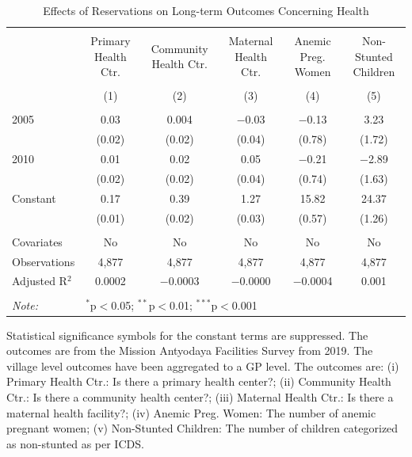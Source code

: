 \begin{table}
\centering
\begin{threeparttable}

  \caption{Effects of Reservations on Long-term Outcomes Concerning Health} 
  \label{raj_shrug_health_05_10} 
\scriptsize 
\begin{tabular}{@{\extracolsep{0pt}}lccccc} 
\\[-1.8ex]\hline 
\hline \\[-1.8ex] 
 & Primary Health Ctr. & Community Health Ctr. & Maternal Health Ctr. & Anemic Preg. Women & Non-Stunted Children \\ 
\\[-1.8ex] & (1) & (2) & (3) & (4) & (5)\\ 
\hline \\[-1.8ex] 
 2005 & 0.03 & 0.004 & $-$0.03 & $-$0.13 & 3.23 \\ 
  & (0.02) & (0.02) & (0.04) & (0.78) & (1.72) \\ 
  2010 & 0.01 & 0.02 & 0.05 & $-$0.21 & $-$2.89 \\ 
  & (0.02) & (0.02) & (0.04) & (0.74) & (1.63) \\ 
  Constant & 0.17 & 0.39 & 1.27 & 15.82 & 24.37 \\ 
  & (0.01) & (0.02) & (0.03) & (0.57) & (1.26) \\ 
 \hline \\[-1.8ex] 
Covariates & No & No & No & No & No \\ 
Observations & 4,877 & 4,877 & 4,877 & 4,877 & 4,877 \\ 
Adjusted R$^{2}$ & 0.0002 & $-$0.0003 & $-$0.0000 & $-$0.0004 & 0.001 \\ 
\hline 
\hline \\[-1.8ex] 
\textit{Note:}  & \multicolumn{5}{l}{$^{*}$p$<$0.05; $^{**}$p$<$0.01; $^{***}$p$<$0.001} \\ 
\end{tabular} 
\begin{tablenotes}[flushleft]
\setlength{\itemindent}{0em}
\scriptsize
\item[] Statistical significance symbols for the constant terms are suppressed. The outcomes are from the Mission Antyodaya Facilities Survey from 2019. The village level outcomes have been aggregated to a GP level. The outcomes are:
                    (i) Primary Health Ctr.: Is there a primary health center?;
                    (ii) Community Health Ctr.: Is there a community health center?;
                    (iii) Maternal Health Ctr.: Is there a maternal health facility?;
                    (iv) Anemic Preg. Women: The number of anemic pregnant women;
                    (v) Non-Stunted Children: The number of children categorized as non-stunted as per ICDS.
\end{tablenotes}
\end{threeparttable}
\end{table}
